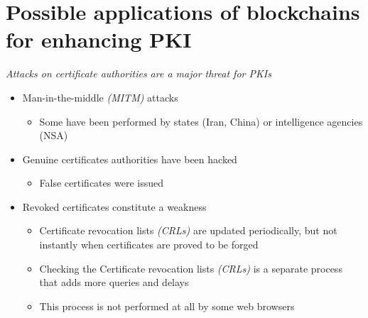 \section[sec2]{Possible applications of blockchains for enhancing PKI}




\begin{frame}
\emph{Attacks on certificate authorities are a major threat for PKIs}

\begin{itemize}
\item Man-in-the-middle \emph{(MITM)} attacks
\begin{itemize}
\item Some have been performed by states (Iran, China) or intelligence agencies (NSA)
\end{itemize}
\item Genuine certificates authorities have been hacked
\begin{itemize}
\item False certificates were issued
\end{itemize}
\item Revoked certificates constitute a weakness
\begin{itemize}
\item Certificate revocation lists \emph{(CRLs)} are updated periodically, but not instantly when certificates are proved to be forged
\item Checking the Certificate revocation lists \emph{(CRLs)} is a separate process that adds more queries and delays
\item This process is not performed at all by some web browsers
\end{itemize}
\end{itemize}


\end{frame}

